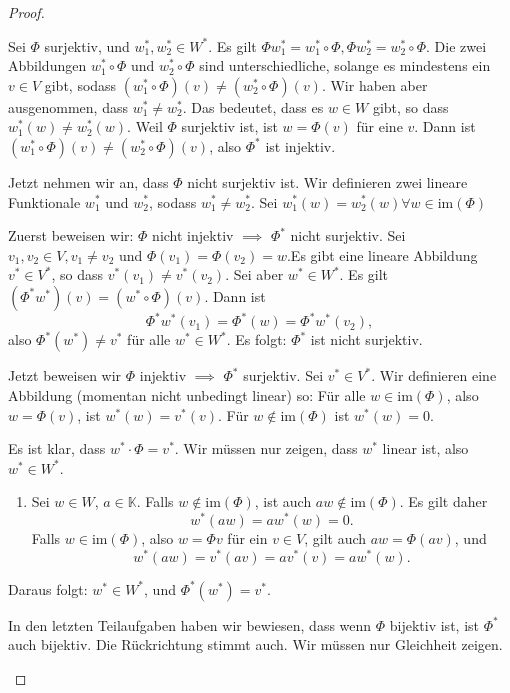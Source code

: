 \begin{proof}
	\begin{parts}
	\item Sei $\Phi$ surjektiv, und $w_1^*,w_2^*\in W^*$. Es gilt $\Phi w_1^*=w_1^*\circ \Phi, \Phi w_2^*=w_2^*\circ \Phi$. Die zwei Abbildungen  $w_1^*\circ \Phi$ und $w_2^*\circ \Phi$ sind unterschiedliche, solange es mindestens ein $v\in V$ gibt, sodass $(w_1^*\circ\Phi)(v)\neq (w_2^*\circ\Phi)(v)$. Wir haben aber ausgenommen, dass $w_1^*\neq w_2^*$. Das bedeutet, dass es $w\in W$ gibt, so dass $w_1^*(w)\neq w_2^*(w)$. Weil $\Phi$ surjektiv ist, ist $w=\Phi(v)$ f\"{u}r eine $v$. Dann ist $(w_1^*\circ\Phi)(v)\neq (w_2^*\circ\Phi)(v)$, also  $\Phi^*$ ist injektiv.

		Jetzt nehmen wir an, dass $\Phi$ nicht surjektiv ist. Wir definieren zwei lineare Funktionale $w_1^*$ und $w_2^*$, sodass $w_1^*\neq w_2^*$. Sei $w_1^*(w)=w_2^*(w)\forall w\in\text{im}(\Phi)$ 
	\item Zuerst beweisen wir: $\Phi$ nicht injektiv $\implies$ $\Phi^*$ nicht surjektiv.
		Sei $v_1,v_2\in V,v_1\neq v_2$ und $\Phi(v_1)=\Phi(v_2)=w$.Es gibt eine lineare Abbildung $v^*\in V^*$, so dass $v^*(v_1)\neq v^*(v_2)$. Sei aber $w^*\in W^*$. Es gilt $\left( \Phi^* w^* \right)(v) =(w^*\circ\Phi)(v)$. Dann ist
		\[
		\Phi^*w^*(v_1)=\Phi^*(w)=\Phi^*w^*(v_2)
		,\] 
		also $\Phi^*(w^*)\neq v^*$ f\"{u}r alle $w^*\in W^*$. Es folgt: $\Phi^*$ ist nicht surjektiv.

		Jetzt beweisen wir $\Phi$ injektiv $\implies$ $\Phi^*$ surjektiv. Sei $v^*\in V^*$. Wir definieren eine Abbildung (momentan nicht unbedingt linear) so: F\"{u}r alle  $w\in \text{im}(\Phi)$, also  $w=\Phi(v)$, ist $w^*(w)=v^*(v)$. F\"{u}r  $w\not\in \text{im}(\Phi)$ ist $w^*(w)=0$. 

		Es ist klar, dass $w^*\cdot \Phi=v^*$. Wir müssen nur zeigen, dass $w^*$ linear ist, also $w^*\in W^*$.
		 \begin{enumerate}[label=(\arabic*)]
			 \item Sei $w\in W$, $a\in \mathbb{K}$. Falls $w \not\in \text{im}(\Phi)$, ist auch $aw\not\in \text{im}(\Phi)$. Es gilt daher
				 \[
				 w^*(aw)=aw^*(w)=0
				 .\] 
				 Falls $w\in \text{im}(\Phi)$, also $w=\Phi v$ f\"{u}r ein $v\in V$, gilt auch $aw=\Phi(av)$, und
				 \[
				 w^*(aw)=v^*(av)=av^*(v)=aw^*(w)
				 .\] 
		\end{enumerate}
		Daraus folgt: $w^*\in W^*$, und $\Phi^*(w^*)=v^*$.
	\item In den letzten Teilaufgaben haben wir bewiesen, dass wenn $\Phi$ bijektiv ist, ist $\Phi^*$ auch bijektiv. Die Rückrichtung stimmt auch. Wir müssen nur Gleichheit zeigen.


\end{parts}
\end{proof}
